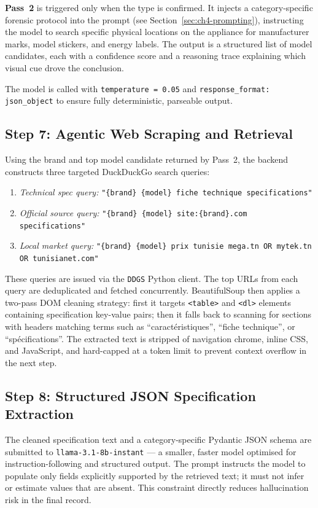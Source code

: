 \textbf{Pass~2} is triggered only when the type is confirmed. It injects a category-specific forensic protocol into the prompt (see Section~\ref{sec:ch4-prompting}), instructing the model to search specific physical locations on the appliance for manufacturer marks, model stickers, and energy labels. The output is a structured list of model candidates, each with a confidence score and a reasoning trace explaining which visual cue drove the conclusion.

The model is called with \texttt{temperature = 0.05} and \texttt{response\_format: json\_object} to ensure fully deterministic, parseable output.

\subsection{Step 7: Agentic Web Scraping and Retrieval}

Using the brand and top model candidate returned by Pass~2, the backend constructs three targeted DuckDuckGo search queries:
\begin{enumerate}
  \item \textit{Technical spec query:} \texttt{"\{brand\} \{model\} fiche technique specifications"}
  \item \textit{Official source query:} \texttt{"\{brand\} \{model\} site:\{brand\}.com specifications"}
  \item \textit{Local market query:} \texttt{"\{brand\} \{model\} prix tunisie mega.tn OR mytek.tn OR tunisianet.com"}
\end{enumerate}

These queries are issued via the \texttt{DDGS} Python client. The top URLs from each query are deduplicated and fetched concurrently. BeautifulSoup then applies a two-pass DOM cleaning strategy: first it targets \texttt{<table>} and \texttt{<dl>} elements containing specification key-value pairs; then it falls back to scanning for sections with headers matching terms such as ``caractéristiques'', ``fiche technique'', or ``spécifications''. The extracted text is stripped of navigation chrome, inline CSS, and JavaScript, and hard-capped at a token limit to prevent context overflow in the next step.

\subsection{Step 8: Structured JSON Specification Extraction}

The cleaned specification text and a category-specific Pydantic JSON schema are submitted to \texttt{llama-3.1-8b-instant} — a smaller, faster model optimised for instruction-following and structured output. The prompt instructs the model to populate only fields explicitly supported by the retrieved text; it must not infer or estimate values that are absent. This constraint directly reduces hallucination risk in the final record.

